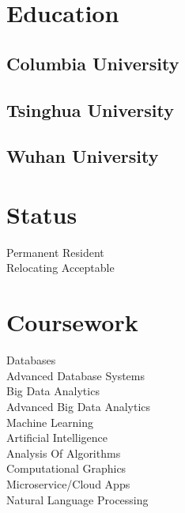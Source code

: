 \documentclass[]{junhu_resume}
\begin{document}
\begin{minipage}[t]{0.28\textwidth} 


\section{Education} 

\subsection{Columbia University}
\sectionsep

\subsection{Tsinghua University}
\sectionsep

\subsection{Wuhan University}
\sectionsep


\section{Status} 
Permanent Resident\\
Relocating Acceptable
\sectionsep





\section{Coursework}
Databases\\
Advanced Database Systems\\
Big Data Analytics\\
Advanced Big Data Analytics\\
Machine Learning\\
Artificial Intelligence\\
Analysis Of Algorithms\\
Computational Graphics\\
Microservice/Cloud Apps\\
Natural Language Processing
\sectionsep



\end{minipage}
\end{document}
